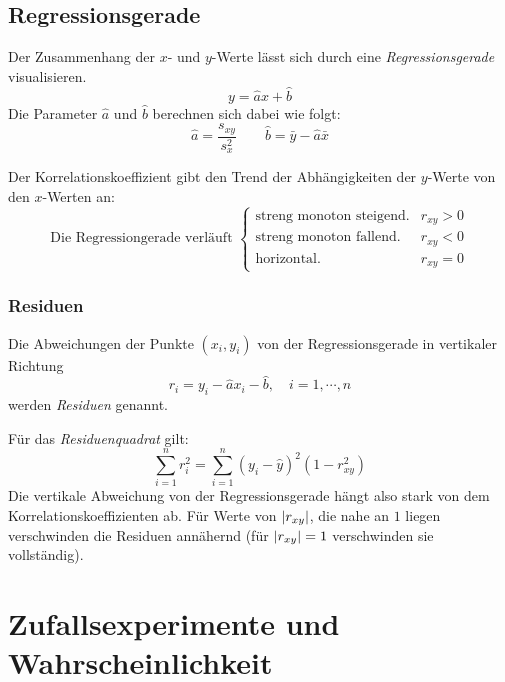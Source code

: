 		\subsection{Regressionsgerade}
			Der Zusammenhang der \(x\)- und \(y\)-Werte lässt sich durch eine \textit{Regressionsgerade} visualisieren.
			\begin{equation*}
				y = \hat{a} x + \hat{b}
			\end{equation*}
			Die Parameter \( \hat{a} \) und \( \hat{b} \) berechnen sich dabei wie folgt:
			\begin{equation*}
				\hat{a} = \frac{s_{xy}}{s_x^2} \qquad \hat{b} = \bar{y} - \hat{a} \bar{x}
			\end{equation*}

			Der Korrelationskoeffizient gibt den Trend der Abhängigkeiten der \(y\)-Werte von den \(x\)-Werten an:
			\begin{equation*}
				\text{Die Regressiongerade verläuft }
				\begin{cases}
					\textrm{streng monoton steigend.} & r_{xy} > 0 \\
					\textrm{streng monoton fallend.}  & r_{xy} < 0 \\
					\textrm{horizontal.}              & r_{xy} = 0
				\end{cases}
			\end{equation*}

			\subsubsection{Residuen}
				Die Abweichungen der Punkte \( (x_i, y_i) \) von der Regressionsgerade in vertikaler Richtung
				\begin{equation*}
					r_i = y_i - \hat{a} x_i - \hat{b}, \quad i = 1, \cdots, n
				\end{equation*}
				werden \textit{Residuen} genannt.

				Für das \textit{Residuenquadrat} gilt:
				\begin{equation*}
					\sum_{i = 1}^{n} r_i^2 = \sum_{i = 1}^{n} (y_i - \hat{y})^2 (1 - r_{xy}^2)
				\end{equation*}
				Die vertikale Abweichung von der Regressionsgerade hängt also stark von dem Korrelationskoeffizienten ab. Für Werte von \( \abs{r_{xy}} \), die nahe an \(1\) liegen verschwinden die Residuen annähernd (für \( \abs{r_{xy}} = 1 \) verschwinden sie vollständig).

	\section{Zufallsexperimente und Wahrscheinlichkeit}
